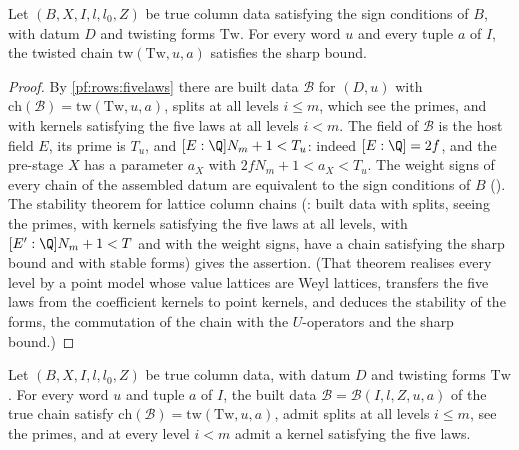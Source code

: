 \begin{proposition}\label{pf:rows:laststep}
Let $(B,X,I,l,l_0,Z)$ be true column data satisfying the sign conditions of $B$, with datum $D$ and twisting forms $\mathrm{Tw}$.
For every word $u$ and every tuple $a$ of $I$, the twisted chain $\mathrm{tw}(\mathrm{Tw},u,a)$ satisfies the sharp bound.
\end{proposition}

\begin{proof}
By \cref{pf:rows:fivelaws} there are built data $\mathcal B$ for $(D,u)$ with $\mathrm{ch}(\mathcal B)=\mathrm{tw}(\mathrm{Tw},u,a)$,
splits at all levels $i\le m$, which see the primes, and with kernels satisfying the five laws at all levels $i<m$. The field of
$\mathcal B$ is the host field $E$, its prime is $T_u$, and $[E:\Q]N_m+1<T_u$: indeed $[E:\Q]=2f$, and the pre-stage $X$ has a
parameter $a_X$ with $2fN_m+1<a_X<T_u$. The weight signs of every chain of the assembled datum are equivalent to the sign conditions of $B$
(). The stability theorem for lattice column chains
(: built data with splits, seeing the primes,
with kernels satisfying the five laws at all levels, with $[E':\Q]N_m+1<T$ and with the weight signs, have a chain satisfying the
sharp bound and with stable forms) gives the assertion. (That theorem realises every level by a point model whose value
lattices are Weyl lattices, transfers the five laws from the coefficient kernels to point kernels, and deduces the stability of
the forms, the commutation of the chain with the $U$-operators and the sharp bound.)
\end{proof}

\begin{proposition}\label{pf:rows:fivelaws}
Let $(B,X,I,l,l_0,Z)$ be true column data, with datum $D$ and twisting forms $\mathrm{Tw}$. For every word $u$ and tuple $a$ of $I$,
the built data $\mathcal B=\mathcal B(I,l,Z,u,a)$ of the true chain satisfy $\mathrm{ch}(\mathcal B)=\mathrm{tw}(\mathrm{Tw},u,a)$,
admit splits at all levels $i\le m$, see the primes, and at every level $i<m$ admit a kernel satisfying the five laws.
\end{proposition}

